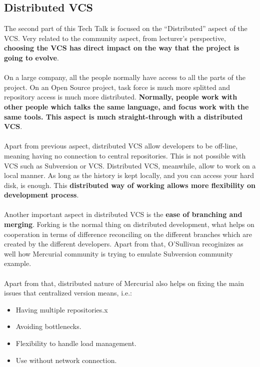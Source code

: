 \documentclass[11pt]{article}
\begin{document}
\subsection{Distributed VCS}
The second part of this Tech Talk is focused on the ``Distributed'' aspect of the VCS. Very related to the community aspect, from lecturer's perspective, \textbf{choosing the VCS has direct impact on the way that the project is going to evolve}.\\
\\
On a large company, all the people normally have access to all the parts of the project. On an Open Source project, task force is much more splitted and repository access is much more distributed. \textbf{Normally, people work with other people which talks the same language, and focus work with the same tools. This aspect is much straight-through with a distributed VCS}.\\
\\
Apart from previous aspect, distributed VCS allow developers to be off-line, meaning having no connection to central repositories. This is not possible with VCS such as Subversion or VCS. Distributed VCS, meanwhile, allow to work on a local manner. As long as the history is kept locally, and you can access your hard disk, is enough. This \textbf{distributed way of working allows more flexibility on development process}.\\
\\
Another important aspect in distributed VCS is the \textbf{ease of branching and merging}. Forking is the normal thing on distributed development, what helps on cooperation in terms of difference reconciling on the different branches which are created by the different developers. Apart from that, O'Sullivan recoginizes as well how Mercurial community is trying to emulate Subversion community example.\\
\\
Apart from that, distributed nature of Mercurial also helps on fixing the main issues that centralized version means, i.e.:
\begin{itemize}\itemsep0pt
\item{Having multiple repositories}.x
\item{Avoiding bottlenecks}.
\item{Flexibility to handle load management}.
\item{Use without network connection}.
\end{itemize}
\end{document}
